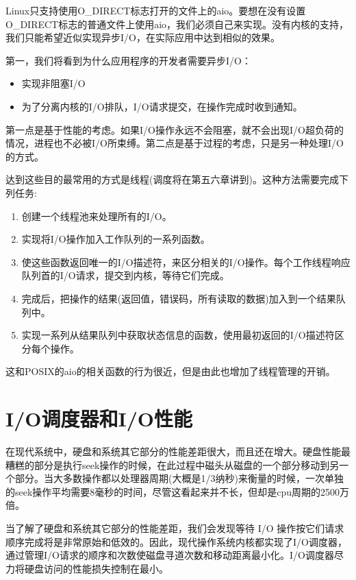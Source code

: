 Linux只支持使用O\_DIRECT标志打开的文件上的aio。要想在没有设置O\_DIRECT标志的普通文件上使用aio，我们必须自己来实现。没有内核的支持，我们只能希望近似实现异步I/O，在实际应用中达到相似的效果。

第一，我们将看到为什么应用程序的开发者需要异步I/O：

\begin{itemize}
\item 实现非阻塞I/O
\item 为了分离内核的I/O排队，I/O请求提交，在操作完成时收到通知。
\end{itemize}

第一点是基于性能的考虑。如果I/O操作永远不会阻塞，就不会出现I/O超负荷的情况，进程也不必被I/O所束缚。第二点是基于过程的考虑，只是另一种处理I/O的方式。

达到这些目的最常用的方式是线程(调度将在第五六章讲到)。这种方法需要完成下列任务:

\begin{enumerate}
\item 创建一个线程池来处理所有的I/O。
\item 实现将I/O操作加入工作队列的一系列函数。
\item 使这些函数返回唯一的I/O描述符，来区分相关的I/O操作。每个工作线程响应队列首的I/O请求，提交到内核，等待它们完成。
\item 完成后，把操作的结果(返回值，错误码，所有读取的数据)加入到一个结果队列中。
\item 实现一系列从结果队列中获取状态信息的函数，使用最初返回的I/O描述符区分每个操作。
\end{enumerate}

这和POSIX的aio的相关函数的行为很近，但是由此也增加了线程管理的开销。

\section{I/O调度器和I/O性能}

在现代系统中，硬盘和系统其它部分的性能差距很大，而且还在增大。硬盘性能最糟糕的部分是执行seek操作的时候，在此过程中磁头从磁盘的一个部分移动到另一个部分。当大多数操作都以处理器周期(大概是1/3纳秒)来衡量的时候，一次单独的seek操作平均需要8毫秒的时间，尽管这看起来并不长，但却是cpu周期的2500万倍。

当了解了硬盘和系统其它部分的性能差距，我们会发现等待 I/O 操作按它们请求顺序完成将是非常原始和低效的。因此，现代操作系统内核都实现了I/O调度器，通过管理I/O请求的顺序和次数使磁盘寻道次数和移动距离最小化。I/O调度器尽力将硬盘访问的性能损失控制在最小。

